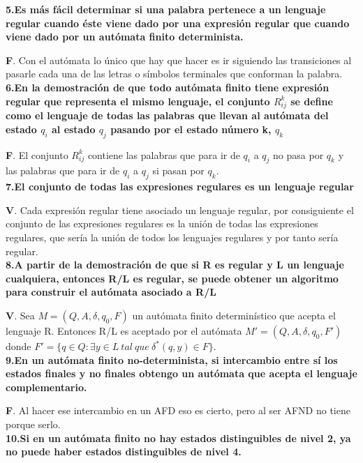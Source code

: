 \documentclass[a4paper,11pt]{article}
\begin{document}
\textbf{5.Es más fácil determinar si una palabra pertenece a un lenguaje regular cuando éste viene dado por una expresión regular que cuando viene dado por un autómata finito determinista.}

\textbf{F}. Con el autómata lo único que hay que hacer es ir siguiendo las transiciones al pasarle cada una de las letras o símbolos terminales que conforman la palabra. \\

\textbf{6.En la demostración de que todo autómata finito tiene expresión regular que representa el mismo lenguaje, el conjunto $R_{ij}^k$ se define como el lenguaje de todas las palabras que llevan al autómata del estado $q_i$ al estado $q_j$ pasando por el estado número k, $q_k$}

\textbf{F}. El conjunto $R_{ij}^k$ contiene las palabras que para ir de $q_i$ a $q_j$ no pasa por $q_k$ y las palabras que para ir de $q_i$ a $q_j$ si pasan por $q_k$. \\

\textbf{7.El conjunto de todas las expresiones regulares es un lenguaje regular}

\textbf{V}. Cada expresión regular tiene asociado un lenguaje regular, por consiguiente el conjunto de las expresiones regulares es la unión de todas las expresiones regulares, que sería la unión de todos los lenguajes regulares y por tanto sería regular. \\

\textbf{8.A partir de la demostración de que si R es regular y L un lenguaje cualquiera, entonces R/L es regular, se puede obtener un algoritmo para construir el autómata asociado a R/L}

\textbf{V}. Sea $M=(Q,A,\delta ,q_0,F)$ un autómata finito determinístico que acepta el lenguaje R. Entonces R/L es aceptado por el autómata $M'=(Q,A,\delta,q_0,F')$ donde $F'=\{q \in Q:\exists y \in L \> tal \> que \> \delta^*(q,y)\in F\}$. \\

\textbf{9.En un autómata finito no-determinista, si intercambio entre sí los estados finales y no finales obtengo un autómata que acepta el lenguaje complementario.}

\textbf{F}. Al hacer ese intercambio en un AFD eso es cierto, pero al ser AFND no tiene porque serlo. \\

\textbf{10.Si en un autómata finito no hay estados distinguibles de nivel 2, ya no puede haber estados distinguibles de nivel 4.}
\end{document}
